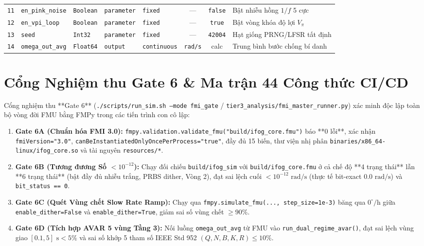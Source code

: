 \documentclass[11pt, a4paper]{article}
\begin{document}
\begin{table}[htbp]
\begin{tabular}{@{}c L{2.5cm} L{1.4cm} L{1.9cm} L{1.7cm} c c L{4.0cm}@{}}
\texttt{11} & \texttt{en\_pink\_noise} & \texttt{Boolean} & \texttt{parameter} & \texttt{fixed} & --- & \texttt{false} & Bật nhiễu hồng $1/f$ 5 cực \\
\texttt{12} & \texttt{en\_vpi\_loop} & \texttt{Boolean} & \texttt{parameter} & \texttt{fixed} & --- & \texttt{true} & Bật vòng khóa độ lợi $V_\pi$ \\
\texttt{13} & \texttt{seed} & \texttt{Int32} & \texttt{parameter} & \texttt{fixed} & --- & \texttt{42004} & Hạt giống PRNG/LFSR tất định \\
\texttt{14} & \texttt{omega\_out\_avg} & \texttt{Float64} & \texttt{output} & \texttt{continuous} & \texttt{rad/s} & calc & Trung bình bước chống bí danh \\
\bottomrule
\end{tabular}
\end{table}

\section{Cổng Nghiệm thu Gate 6 \& Ma trận 44 Công thức CI/CD}

Cổng nghiệm thu **Gate 6** (\texttt{./scripts/run\_sim.sh --mode fmi\_gate} / \texttt{tier3\_analysis/fmi\_master\_runner.py}) xác minh độc lập toàn bộ vòng đời FMU bằng FMPy trong các tiến trình con cô lập:
\begin{enumerate}
    \item \textbf{Gate 6A (Chuẩn hóa FMI 3.0):} \texttt{fmpy.validation.validate\_fmu("build/ifog\_core.fmu")} báo **0 lỗi**, xác nhận \texttt{fmiVersion="3.0"}, \texttt{canBeInstantiatedOnlyOncePerProcess="true"}, đầy đủ 15 biến, thư viện nhị phân \texttt{binaries/x86\_64-linux/ifog\_core.so} và tài nguyên \texttt{resources/*}.
    \item \textbf{Gate 6B (Tương đương Số $< 10^{-12}$):} Chạy đối chiếu \texttt{build/ifog\_sim} với \texttt{build/ifog\_core.fmu} ở cả chế độ **4 trạng thái** lẫn **6 trạng thái** (bật đầy đủ nhiễu trắng, PRBS dither, Vòng 2), đạt sai lệch cuối $< 10^{-12}\text{ rad/s}$ (thực tế bit-exact $0.0\text{ rad/s}$) và \texttt{bit\_status == 0}.
    \item \textbf{Gate 6C (Quét Vùng chết Slow Rate Ramp):} Chạy qua \texttt{fmpy.simulate\_fmu(..., step\_size=1e-3)} băng qua $0^\circ/\text{h}$ giữa \texttt{enable\_dither=False} và \texttt{enable\_dither=True}, giảm sai số vùng chết $\ge 90\%$.
    \item \textbf{Gate 6D (Tích hợp AVAR 5 vùng Tầng 3):} Nối luồng \texttt{omega\_out\_avg} từ FMU vào \texttt{run\_dual\_regime\_avar()}, đạt sai lệch vùng giao $[0.1, 5]\text{ s} < 5\%$ và sai số khớp 5 tham số IEEE Std 952 $(Q,N,B,K,R) \le 10\%$.
\end{enumerate}
\end{document}
